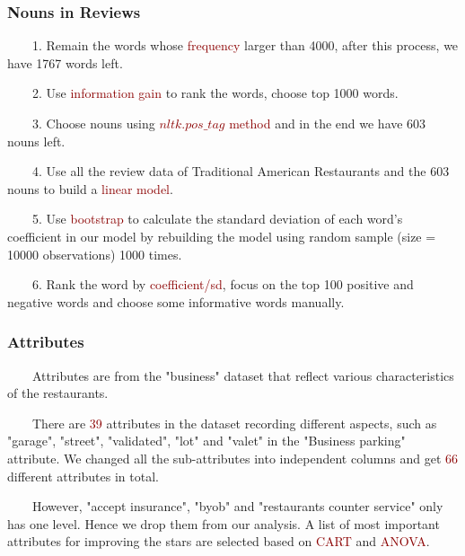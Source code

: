 \documentclass[notheorems, aspectratio=54]{beamer}
\begin{document}
\begin{frame}
\frametitle{Nouns in Reviews}
\ \ \ \ 1. Remain the words whose \textcolor{darkred}{frequency} larger than 4000, after this process, we have 1767 words left.
\vspace{1.5ex}

\ \ \ \ 2. Use \textcolor{darkred}{information gain} to rank the words, choose top 1000 words.
\vspace{1.5ex}

\ \ \ \ 3. Choose nouns using \textcolor{darkred}{$nltk.pos\_tag$ method} and in the end we have 603 nouns left.
\vspace{1.5ex}

\ \ \ \ 4. Use all the review data of Traditional American Restaurants and the 603 nouns to build a \textcolor{darkred}{linear model}.
\vspace{1.5ex}

\ \ \ \ 5. Use \textcolor{darkred}{bootstrap} to calculate the standard deviation of each word's coefficient in our model by rebuilding the model using random sample (size = 10000 observations) 1000 times.
\vspace{1.5ex}

\ \ \ \ 6. Rank the word by \textcolor{darkred}{coefficient/sd}, focus on the top 100 positive and negative words and choose some informative words manually.

\end{frame}

\begin{frame}
\frametitle{Attributes}

\ \ \ \ Attributes are from the "business" dataset that reflect various characteristics of the restaurants.
\vspace{2ex}

\ \ \ \ There are \textcolor{darkred}{39} attributes in the dataset recording different aspects, such as "garage", "street", "validated", "lot" and "valet" in the "Business parking" attribute. We changed all the sub-attributes into independent columns and get \textcolor{darkred}{66} different attributes in total. 
\vspace{2ex}

\ \ \ \ However, "accept insurance", "byob" and "restaurants counter service" only has one level. Hence we drop them from our analysis. A list of most important attributes for improving the stars are selected based on \textcolor{darkred}{CART} and \textcolor{darkred}{ANOVA}.

\end{frame}
\end{document}
